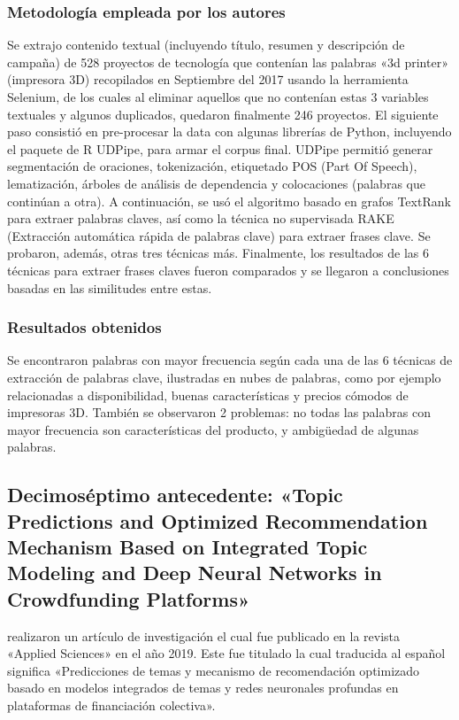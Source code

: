 \subsubsection{Metodología empleada por los autores}
Se extrajo contenido textual (incluyendo título, resumen y descripción de campaña) de 528 proyectos de tecnología que contenían las palabras «3d printer» (impresora 3D) recopilados en Septiembre del 2017 usando la herramienta Selenium, de los cuales al eliminar aquellos que no contenían estas 3 variables textuales y algunos duplicados, quedaron finalmente 246 proyectos. El siguiente paso consistió en pre-procesar la data con algunas librerías de Python, incluyendo el paquete de R UDPipe, para armar el corpus final. UDPipe permitió generar segmentación de oraciones, tokenización, etiquetado POS (Part Of Speech), lematización, árboles de análisis de dependencia y colocaciones (palabras que continúan a otra). A continuación, se usó el algoritmo basado en grafos TextRank para extraer palabras claves, así como la técnica no supervisada RAKE (Extracción automática rápida de palabras clave) para extraer frases clave. Se probaron, además, otras tres técnicas más.
Finalmente, los resultados de las 6 técnicas para extraer frases claves fueron comparados y se llegaron a conclusiones basadas en las similitudes entre estas.

\subsubsection{Resultados obtenidos}
Se encontraron palabras con mayor frecuencia según cada una de las 6 técnicas de extracción de palabras clave, ilustradas en nubes de palabras, como por ejemplo relacionadas a disponibilidad, buenas características y precios cómodos de impresoras 3D. También se observaron 2 problemas: no todas las palabras con mayor frecuencia son características del producto, y ambigüedad de algunas palabras.

\subsection{Decimoséptimo antecedente: «Topic Predictions and Optimized Recommendation	Mechanism Based on Integrated Topic Modeling and Deep Neural Networks in Crowdfunding Platforms» \citep*{pr_shafqat2019topicpredictions}}
\citeauthor{pr_shafqat2019topicpredictions} realizaron un artículo de investigación el cual fue publicado en la revista «Applied Sciences» en el año 2019. Este fue titulado  la cual traducida al español significa «Predicciones de temas y mecanismo de recomendación optimizado basado en modelos integrados de temas y redes neuronales profundas en plataformas de financiación colectiva».


